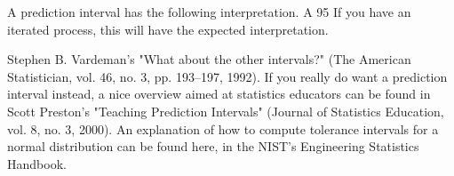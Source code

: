 A prediction interval has the following interpretation. A 95%
If you have an iterated process, this will have the expected interpretation. 




Stephen B. Vardeman's "What about the other intervals?" (The American Statistician, vol. 46, no. 3, pp. 193–197, 1992). If you really do want a prediction interval instead, a nice overview aimed at statistics educators can be found in Scott Preston's "Teaching Prediction Intervals" (Journal of Statistics Education, vol. 8, no. 3, 2000). An explanation of how to compute tolerance intervals for a normal distribution can be found here, in the NIST's Engineering Statistics Handbook.
